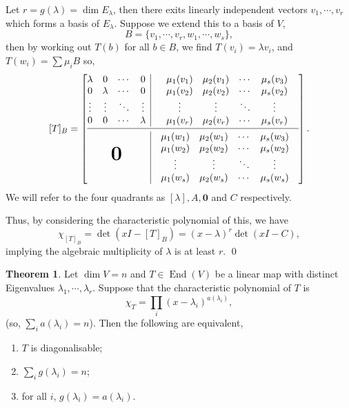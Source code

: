 \documentclass[
]{article}
\theoremstyle{definition}
\newtheorem{theorem}{Theorem}
\theoremstyle{definition}
\begin{document}
Let \(r = g(\lambda) = \dim E_{\lambda}\), then there exits linearly
independent vectors \(v_1, \cdots, v_r\) which forms a basis of
\(E_{\lambda}\). Suppose we extend this to a basis of \(V\),
\[B = \{v_1, \cdots, v_r, w_1, \cdots, w_s\},\] then by working out
\(T(b)\) for all \(b \in B\), we find \(T(v_i) = \lambda v_i\), and
\(T(w_i) = \sum \mu_i B\) so, \[ [T]_B =
  \left[
    \begin{array}{@{}c|c@{}}
      \begin{matrix}
        \lambda & 0 & \cdots & 0 \\
        0 & \lambda & \cdots & 0 \\
        \vdots & \vdots & \ddots & \vdots \\
        0 & 0 & \cdots & \lambda \\
      \end{matrix}
          & 
      \begin{matrix}
        \mu_1(v_1) & \mu_2(v_1) & \cdots & \mu_s(v_3) \\
        \mu_1(v_2) & \mu_2(v_2) & \cdots & \mu_s(v_2) \\
        \vdots & \vdots & \ddots & \vdots\\
        \mu_1(v_r) & \mu_2(v_r) & \cdots & \mu_s(v_r)\\
      \end{matrix} \\
      \cmidrule[0.4pt]{1-2}
      \textbf{\text{\huge0}} & \hspace{2mm}
      \begin{matrix}
        \mu_1(w_1) & \mu_2(w_1) & \cdots & \mu_s(w_3)\\
        \mu_1(w_2) & \mu_2(w_2) & \cdots & \mu_s(w_2)\\
        \vdots & \vdots & \ddots & \vdots &\\
        \mu_1(w_s) & \mu_2(w_s) & \cdots & \mu_s(w_s)\\
      \end{matrix} \\
    \end{array} 
  \right]. \] We will refer to the four quadrants as
\([\lambda], A, \mathbf{0}\) and \(C\) respectively.

Thus, by considering the characteristic polynomial of this, we have
\[\chi_{[T]_B} = \det(xI - [T]_B) =  (x - \lambda)^r \det(xI - C),\]
implying the algebraic multiplicity of \(\lambda\) is at least \(r\).
\qed

\begin{theorem}
  Let \(\dim V = n\) and \(T \in \mathop{\mathrm{End}}(V)\) be a linear map with distinct 
  Eigenvalues \(\lambda_1, \cdots, \lambda_r\). Suppose that the characteristic 
  polynomial of \(T\) is 
  \[\chi_T = \prod_i (x - \lambda_i)^{a(\lambda_i)},\]
  (so, \(\sum_i a(\lambda_i) = n\)). Then the following are equivalent,
  \begin{enumerate}
    \item \(T\) is diagonalisable;
    \item \(\sum_i g(\lambda_i) = n\);
    \item for all \(i\), \(g(\lambda_i) = a(\lambda_i)\).
  \end{enumerate}
\end{theorem}
\proof
\end{document}
